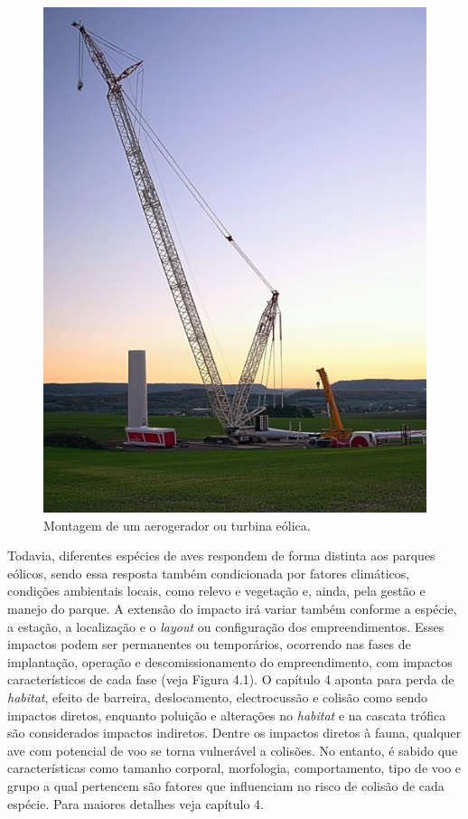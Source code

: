 \documentclass[
  oneside]{scrbook}
\begin{document}
\begin{figure}[H]

{\centering \includegraphics[width=0.6\linewidth]{imagens/cap06/Figura_6.1} 

}

\caption{Montagem de um aerogerador ou turbina eólica.}\label{fig:18}
\end{figure}

Todavia, diferentes espécies de aves respondem de forma distinta aos parques eólicos, sendo essa resposta também condicionada por fatores climáticos, condições ambientais locais, como relevo e vegetação e, ainda, pela gestão e manejo do parque. A extensão do impacto irá variar também conforme a espécie, a estação, a localização e o \emph{layout} ou configuração dos empreendimentos. Esses impactos podem ser permanentes ou temporários, ocorrendo nas fases de implantação, operação e descomissionamento do empreendimento, com impactos característicos de cada fase (veja Figura 4.1). O capítulo 4 aponta para perda de \emph{habitat}, efeito de barreira, deslocamento, electrocussão e colisão como sendo impactos diretos, enquanto poluição e alterações no \emph{habitat} e na cascata trófica são considerados impactos indiretos. Dentre os impactos diretos à fauna, qualquer ave com potencial de voo se torna vulnerável a colisões. No entanto, é sabido que características como tamanho corporal, morfologia, comportamento, tipo de voo e grupo a qual pertencem são fatores que influenciam no risco de colisão de cada espécie. Para maiores detalhes veja capítulo 4.
\end{document}
